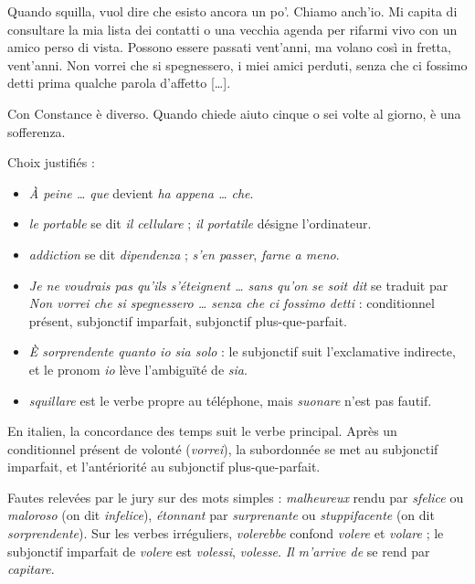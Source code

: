 \documentclass[11pt,a4paper]{article}
\providecommand{\tightlist}{\setlength{\itemsep}{0pt}\setlength{\parskip}{0pt}}
\begin{document}
Quando squilla, vuol dire che esisto ancora un po'. Chiamo anch'io. Mi capita di consultare la mia lista dei contatti o una vecchia agenda per rifarmi vivo con un amico perso di vista. Possono essere passati vent'anni, ma volano così in fretta, vent'anni. Non vorrei che si spegnessero, i miei amici perduti, senza che ci fossimo detti prima qualche parola d'affetto {[}\ldots{]}.

Con Constance è diverso. Quando chiede aiuto cinque o sei volte al giorno, è una sofferenza.

Choix justifiés :

\begin{itemize}
\tightlist
\item
  \emph{À peine \ldots{} que} devient \emph{ha appena \ldots{} che}.
\item
  \emph{le portable} se dit \emph{il cellulare} ; \emph{il portatile} désigne l'ordinateur.
\item
  \emph{addiction} se dit \emph{dipendenza} ; \emph{s'en passer}, \emph{farne a meno}.
\item
  \emph{Je ne voudrais pas qu'ils s'éteignent \ldots{} sans qu'on se soit dit} se traduit par \emph{Non vorrei che si spegnessero \ldots{} senza che ci fossimo detti} : conditionnel présent, subjonctif imparfait, subjonctif plus-que-parfait.
\item
  \emph{È sorprendente quanto io sia solo} : le subjonctif suit l'exclamative indirecte, et le pronom \emph{io} lève l'ambiguïté de \emph{sia}.
\item
  \emph{squillare} est le verbe propre au téléphone, mais \emph{suonare} n'est pas fautif.
\end{itemize}

\begin{methode}

En italien, la concordance des temps suit le verbe principal. Après un conditionnel présent de volonté (\emph{vorrei}), la subordonnée se met au subjonctif imparfait, et l'antériorité au subjonctif plus-que-parfait.

\end{methode}

\begin{piege}

Fautes relevées par le jury sur des mots simples : \emph{malheureux} rendu par \emph{sfelice} ou \emph{maloroso} (on dit \emph{infelice}), \emph{étonnant} par \emph{surprenante} ou \emph{stuppifacente} (on dit \emph{sorprendente}). Sur les verbes irréguliers, \emph{volerebbe} confond \emph{volere} et \emph{volare} ; le subjonctif imparfait de \emph{volere} est \emph{volessi}, \emph{volesse}. \emph{Il m'arrive de} se rend par \emph{capitare}.

\end{piege}
\end{document}
